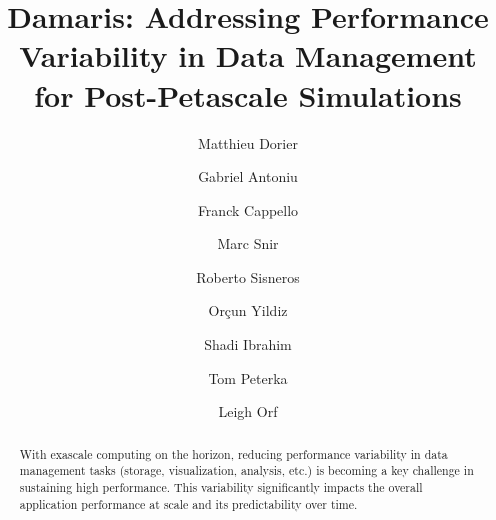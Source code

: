 \documentclass[preprint]{elsarticle}
\begin{document}
\begin{frontmatter}



\title{Damaris: Addressing Performance Variability in Data Management for Post-Petascale Simulations}


\author[ens]{Matthieu Dorier}
\author[inria]{Gabriel Antoniu}
\author[anl]{Franck Cappello}
\author[anl,uiuc]{Marc Snir}
\author[uiuc]{Roberto Sisneros}
\author[inria]{Or\c{c}un Yildiz}
\author[inria]{Shadi Ibrahim}
\author[anl]{Tom Peterka}
\author[cmich]{Leigh Orf}



\address[ens]{ENS Rennes, IRISA, Rennes, France}
\address[inria]{Inria, Rennes - Bretagne Atlantique Research Centre, France}
\address[anl]{Argonne National Laboratory, Lemont, IL, USA}
\address[uiuc]{University of Illinois at Urbana Champaign, IL, USA}
\address[cmich]{Central Michigan University, MI, USA}

\begin{abstract}
With exascale computing on the horizon, reducing performance variability in data management tasks (storage, visualization, analysis, etc.) is becoming a key challenge in sustaining high performance.
This variability significantly impacts the overall application performance at scale and its predictability over time. 


\end{abstract}
\end{frontmatter}
\end{document}

